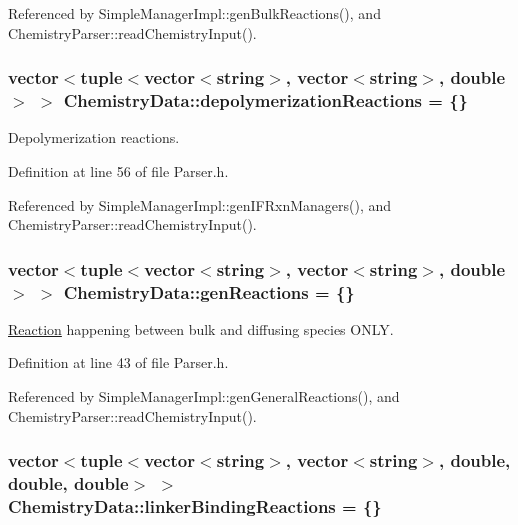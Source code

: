 Referenced by Simple\+Manager\+Impl\+::gen\+Bulk\+Reactions(), and Chemistry\+Parser\+::read\+Chemistry\+Input().

\hypertarget{structChemistryData_aac04b01fc7430d924ce82eee1835cbc7}{
\subsubsection[{depolymerization\+Reactions}]{\setlength{\rightskip}{0pt plus 5cm}vector$<$tuple$<$vector$<$string$>$, vector$<$string$>$, double$>$ $>$ Chemistry\+Data\+::depolymerization\+Reactions = \{\}}}\label{structChemistryData_aac04b01fc7430d924ce82eee1835cbc7}


Depolymerization reactions. 



Definition at line 56 of file Parser.\+h.



Referenced by Simple\+Manager\+Impl\+::gen\+I\+F\+Rxn\+Managers(), and Chemistry\+Parser\+::read\+Chemistry\+Input().

\hypertarget{structChemistryData_a4faa68797fd22c5247b9b52a9057023a}{
\subsubsection[{gen\+Reactions}]{\setlength{\rightskip}{0pt plus 5cm}vector$<$tuple$<$vector$<$string$>$, vector$<$string$>$, double$>$ $>$ Chemistry\+Data\+::gen\+Reactions = \{\}}}\label{structChemistryData_a4faa68797fd22c5247b9b52a9057023a}


\hyperlink{classReaction}{Reaction} happening between bulk and diffusing species O\+N\+L\+Y. 



Definition at line 43 of file Parser.\+h.



Referenced by Simple\+Manager\+Impl\+::gen\+General\+Reactions(), and Chemistry\+Parser\+::read\+Chemistry\+Input().

\hypertarget{structChemistryData_ae3e27a2c950e196017c06f416ee94628}{
\subsubsection[{linker\+Binding\+Reactions}]{\setlength{\rightskip}{0pt plus 5cm}vector$<$tuple$<$vector$<$string$>$, vector$<$string$>$, double, double, double$>$ $>$ Chemistry\+Data\+::linker\+Binding\+Reactions = \{\}}}\label{structChemistryData_ae3e27a2c950e196017c06f416ee94628}


